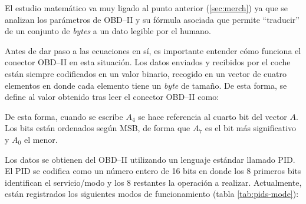 El estudio matemático va muy ligado al punto anterior (\ref{sec:merch}) ya que se
analizan los parámetros de \ac{OBD}--II y su fórmula asociada que permite
``traducir'' de un conjunto de \textit{bytes} a un dato legible por el humano.

Antes de dar paso a las ecuaciones en sí, es importante entender cómo funciona
el conector \ac{OBD}--II en esta situación. Los datos enviados y recibidos por
el coche están siempre codificados en un valor binario, recogido en un vector
de cuatro elementos en donde cada elemento tiene un \textit{byte} de tamaño. De
esta forma, se define al valor obtenido tras leer el conector \ac{OBD}--II como:

\begin{table}[H]
  \centering
  \caption{Vector de \textit{bytes} que representa los datos recibidos del conector \ac{OBD}--II \cite{OBDIIPIDs2021}.}
  \label{tab:byte-array}
\end{table}

De esta forma, cuando se escribe $A_4$ se hace referencia al cuarto bit
del vector $A$. Los bits están ordenados según \ac{MSB}, de forma que
$A_7$ es el bit más significativo y $A_0$ el menor.

Los datos se obtienen del \ac{OBD}--II utilizando un lenguaje estándar llamado
\ac{PID}. El \ac{PID} se codifica como un número entero de 16 bits en donde los 8
primeros bits identifican el servicio/modo y los 8 restantes la operación a realizar.
Actualmente, están registrados los siguientes modos de funcionamiento (tabla
\ref{tab:pids-mode}):

